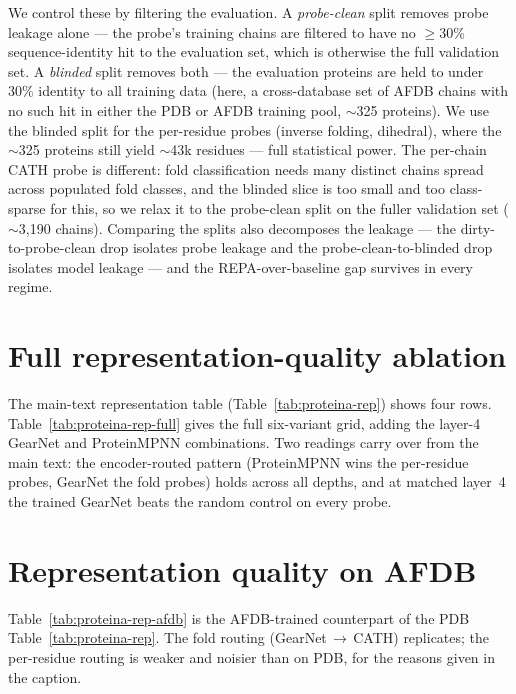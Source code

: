 \documentclass[12pt,a4paper,twoside]{report}
\begin{document}
We control these by filtering the evaluation. A \emph{probe-clean} split removes probe leakage alone --- the probe's training chains are filtered to have no $\ge$30\% sequence-identity hit to the evaluation set, which is otherwise the full validation set. A \emph{blinded} split removes both --- the evaluation proteins are held to under 30\% identity to all training data (here, a cross-database set of AFDB chains with no such hit in either the PDB or AFDB training pool, $\sim$325 proteins). We use the blinded split for the per-residue probes (inverse folding, dihedral), where the $\sim$325 proteins still yield $\sim$43k residues --- full statistical power. The per-chain CATH probe is different: fold classification needs many distinct chains spread across populated fold classes, and the blinded slice is too small and too class-sparse for this, so we relax it to the probe-clean split on the fuller validation set ($\sim$3{,}190 chains). Comparing the splits also decomposes the leakage --- the dirty-to-probe-clean drop isolates probe leakage and the probe-clean-to-blinded drop isolates model leakage --- and the REPA-over-baseline gap survives in every regime.

\section{Full representation-quality ablation}
\label{app:rep-full}

The main-text representation table (Table~\ref{tab:proteina-rep}) shows four rows. Table~\ref{tab:proteina-rep-full} gives the full six-variant grid, adding the layer-4 GearNet and ProteinMPNN combinations. Two readings carry over from the main text: the encoder-routed pattern (ProteinMPNN wins the per-residue probes, GearNet the fold probes) holds across all depths, and at matched layer~4 the trained GearNet beats the random control on every probe.



\section{Representation quality on AFDB}
\label{app:rep-afdb}

Table~\ref{tab:proteina-rep-afdb} is the AFDB-trained counterpart of the PDB Table~\ref{tab:proteina-rep}. The fold routing (GearNet\,$\to$\,CATH) replicates; the per-residue routing is weaker and noisier than on PDB, for the reasons given in the caption.
\end{document}
